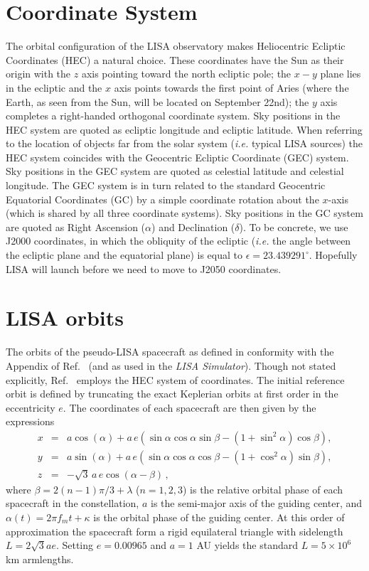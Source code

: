 \documentclass[11pt]{report}
\begin{document}
\section{Coordinate System}
\label{sec:coordinates}

The orbital configuration of the LISA observatory makes
Heliocentric Ecliptic Coordinates (HEC) a natural choice. These coordinates have the Sun as their
origin with the $z$ axis pointing toward the north ecliptic pole; the $x-y$
plane lies in the ecliptic and the $x$ axis points towards the first point of Aries (where the Earth,
as seen from the Sun, will be located on September 22nd); the $y$ axis completes
a right-handed orthogonal coordinate system. Sky positions in the HEC system are quoted as
ecliptic longitude and ecliptic latitude. When referring to the location of objects far from
the solar system ({\it i.e.} typical LISA sources) the HEC system coincides with the
Geocentric Ecliptic Coordinate (GEC) system. Sky positions in the GEC system are quoted as
celestial latitude and celestial longitude. The GEC system is in turn related to the standard Geocentric
Equatorial Coordinates (GC) by a simple coordinate rotation about the $x$-axis (which is shared by all
three coordinate systems). Sky positions in the GC system are quoted as Right Ascension ($\alpha$)
and Declination ($\delta$). To be concrete, we use J2000 coordinates, in which the obliquity of
the ecliptic ({\it i.e.} the angle between the ecliptic plane and the equatorial plane) is
equal to $\epsilon = 23.439291^\circ$. Hopefully LISA will launch before we need to move to
J2050 coordinates. 


\section{LISA orbits}
\label{sec:orbits}

The orbits of the pseudo-LISA spacecraft as defined in conformity with the Appendix of Ref.~\cite{cr2003}
(and as used in the \emph{LISA Simulator}). Though not stated explicitly, Ref.~\cite{cr2003} employs the
HEC system of coordinates. The initial reference orbit is defined by
truncating the exact Keplerian orbits at first order in the eccentricity $e$. The coordinates of each
spacecraft are then given by the expressions
%
\begin{eqnarray}
x &=& a\cos(\alpha) + a \, e\left(\sin\alpha\cos\alpha\sin\beta
-(1+\sin^2\alpha)\cos\beta\right), \nonumber \\
y &=& a\sin(\alpha) + a \, e\left(\sin\alpha\cos\alpha\cos\beta
-(1+\cos^2\alpha)\sin\beta\right), \\
z & = & -\sqrt{3} \, a \, e \cos(\alpha-\beta) \, , \nonumber
\end{eqnarray}
%
where $\beta = 2(n-1)\pi/3 + \lambda$ ($n=1,2,3$) is the relative orbital phase of each spacecraft in the
constellation, $a$ is the semi-major axis of the guiding center, and $\alpha(t)=2\pi f_m t + \kappa$ is
the orbital phase of the guiding center. At this order of approximation the spacecraft form
a rigid equilateral triangle with sidelength $L = 2\sqrt{3} a e$. Setting $e=0.00965$ and $a = 1$ AU yields
the standard $L=5\times 10^6$ km armlengths. 
\end{document}
